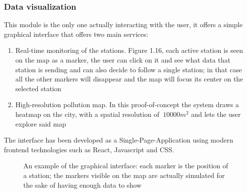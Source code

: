 \documentclass[11pt,a4paper,titlepage]{book}
\begin{document}
\subsubsection{Data visualization}
This module is the only one actually interacting with the user, it offers a simple graphical interface that offers two main services:
\begin{enumerate}
    \item Real-time monitoring of the stations. Figure 1.16, each active station is seen on the map as a marker, the user can click on it and see what data that station is sending and can also decide to follow a single station; in that case all the other markers will disappear and the map will focus its center on the selected station
    \item High-resolution pollution map. In this proof-of-concept the system draws a heatmap on the city, with a spatial resolution of $~10000m^2$ and lets the user explore said map
\end{enumerate}
The interface has been developed as a Single-Page-Application using modern frontend technologies such as React, Javascript and CSS.
\begin{figure}[ht]
    \centering
    
    \caption{An example of the graphical interface: each marker is the position of a station; the markers visible on the map are actually simulated for the sake of having enough data to show}
    \label{cleanair_frontend}
\end{figure}
\end{document}
